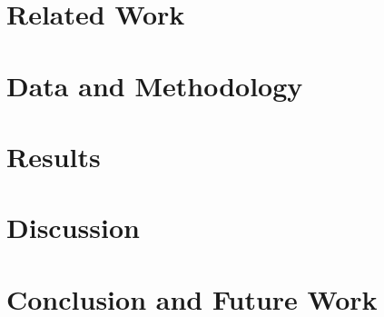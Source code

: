 \documentclass[sigconf,natbib=false, language=english]{acmart}
\begin{document}
\section{Related Work}
\label{sec:related}

\section{Data and Methodology}
\label{sec:method}

\section{Results}
\label{sec:results}

\section{Discussion}
\label{sec:discussion}

\section{Conclusion and Future Work}
\label{sec:conclusion}


\printbibliography
\end{document}
